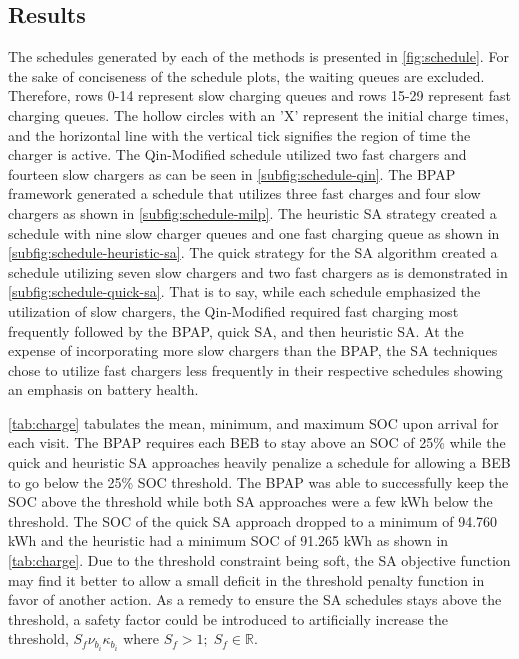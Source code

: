 \documentclass[energies,article,submit,moreauthors]{Definitions/mdpi}
\begin{document}
\subsection{Results}
\label{sec:sa-results}
The schedules generated by each of the methods is presented in \ref{fig:schedule}. For the sake of conciseness of the
schedule plots, the waiting queues are excluded. Therefore, rows 0-14 represent slow charging queues and rows 15-29
represent fast charging queues. The hollow circles with an 'X' represent the initial charge times, and the horizontal
line with the vertical tick signifies the region of time the charger is active. The Qin-Modified schedule utilized two
fast chargers and fourteen slow chargers as can be seen in \ref{subfig:schedule-qin}. The BPAP framework generated a
schedule that utilizes three fast charges and four slow chargers as shown in \ref{subfig:schedule-milp}. The heuristic
SA strategy created a schedule with nine slow charger queues and one fast charging queue as shown in
\ref{subfig:schedule-heuristic-sa}. The quick strategy for the SA algorithm created a schedule utilizing seven slow
chargers and two fast chargers as is demonstrated in \ref{subfig:schedule-quick-sa}. That is to say, while each schedule
emphasized the utilization of slow chargers, the Qin-Modified required fast charging most frequently followed by the
BPAP, quick SA, and then heuristic SA. At the expense of incorporating more slow chargers than the BPAP, the SA
techniques chose to utilize fast chargers less frequently in their respective schedules showing an emphasis on battery
health.

\ref{tab:charge} tabulates the mean, minimum, and maximum SOC upon arrival for each visit. The BPAP requires each BEB to stay
above an SOC of 25\% while the quick and heuristic SA approaches heavily penalize a schedule for allowing a BEB to go
below the 25\% SOC threshold. The BPAP was able to successfully keep the SOC above the threshold while both SA approaches
were a few kWh below the threshold. The SOC of the quick SA approach dropped to a minimum of 94.760 kWh and the
heuristic had a minimum SOC of 91.265 kWh as shown in \ref{tab:charge}. Due to the threshold constraint being soft, the SA
objective function may find it better to allow a small deficit in the threshold penalty function in favor of another
action. As a remedy to ensure the SA schedules stays above the threshold, a safety factor could be introduced to
artificially increase the threshold, \(S_f \nu_{b_i}\kappa_{b_i}\) where \(S_f > 1;\; S_f \in \mathbb{R}\).
\end{document}
